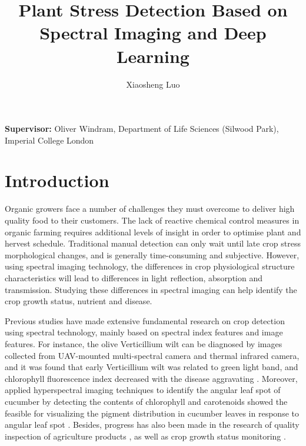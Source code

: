 \documentclass[11pt]{article}
\title{\textbf{Plant Stress Detection Based on Spectral Imaging and Deep Learning}}
\author[]{Xiaosheng Luo}
\affil[]{Imperial College London}
\date{}
\begin{document}
  \maketitle

\section*{}
\begin{center}
	\textbf{Supervisor:} Oliver Windram, Department of Life Sciences (Silwood Park), Imperial College London
\end{center}


\newpage
\section*{Introduction}
\begin{linenumbers}
Organic growers face a number of challenges they must overcome to deliver high quality food to their customers. The lack of reactive chemical control measures in organic farming requires additional levels of insight in order to optimise plant and hervest schedule. Traditional manual detection can only wait until late crop stress morphological changes, and is generally time-consuming and subjective. However, using spectral imaging technology, the differences in crop physiological structure characteristics will lead to differences in light reflection, absorption and transmission. Studying these differences in spectral imaging can help identify the crop growth status, nutrient and disease.

Previous studies have made extensive fundamental research on crop detection using spectral technology, mainly based on spectral index features and image features. For instance, the olive Verticillium wilt can be diagnosed by images collected from UAV-mounted multi-spectral camera and thermal infrared camera, and it was found that early Verticillium wilt was related to green light band, and chlorophyll fluorescence index decreased with the disease aggravating \citep{calderon2013high}. Moreover, applied hyperspectral imaging techniques to identify the angular leaf spot of cucumber by detecting the contents of chlorophyll and carotenoids showed the feasible for visualizing the pigment distribution in cucumber leaves in response to angular leaf spot \citep{zhao2016hyperspectral}. Besides, progress has also been made in the research of quality inspection of agriculture products \citep{suz_monitoring_2015}, as well as crop growth status monitoring \citep{suz_monitoring_2015}.


\end{linenumbers}
\end{document}
